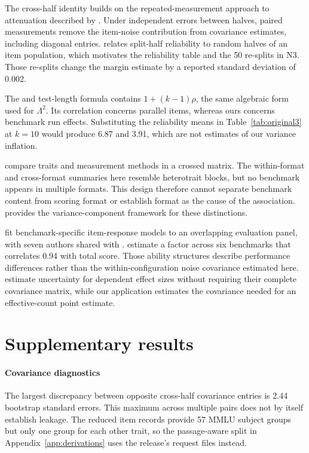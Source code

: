 The cross-half identity builds on the repeated-measurement approach to attenuation described by \citet{spearman1904}. Under independent errors between halves, paired measurements remove the item-noise contribution from covariance estimates, including diagonal entries. \citet{cronbach1951} relates split-half reliability to random halves of an item population, which motivates the reliability table and the 50 re-splits in N3. Those re-splits change the margin estimate by a reported standard deviation of 0.002.

The \citet{brown1910} and \citet{spearman1910} test-length formula contains $1+(k-1)\rho$, the same algebraic form used for $\Lambda^2$. Its correlation concerns parallel items, whereas ours concerns benchmark run effects. Substituting the reliability means in Table~\ref{tab:original3} at $k=10$ would produce 6.87 and 3.91, which are not estimates of our variance inflation.

\citet{campbell1959} compare traits and measurement methods in a crossed matrix. The within-format and cross-format summaries here resemble heterotrait blocks, but no benchmark appears in multiple formats. This design therefore cannot separate benchmark content from scoring format or establish format as the cause of the association. \citet{brennan2001} provides the variance-component framework for these distinctions.

\citet{hofmann2025} fit benchmark-specific item-response models to an overlapping evaluation panel, with seven authors shared with \citet{heineman2025}. \citet{kipnis2024} estimate a factor across six benchmarks that correlates 0.94 with total score. Those ability structures describe performance differences rather than the within-configuration noise covariance estimated here. \citet{hedges2010} estimate uncertainty for dependent effect sizes without requiring their complete covariance matrix, while our application estimates the covariance needed for an effective-count point estimate.

\section{Supplementary results}
\label{app:supplementary}

\paragraph{Covariance diagnostics}
The largest discrepancy between opposite cross-half covariance entries is 2.44 bootstrap standard errors. This maximum across multiple pairs does not by itself establish leakage. The reduced item records provide 57 MMLU subject groups but only one group for each other trait, so the passage-aware split in Appendix~\ref{app:derivations} uses the release's request files instead.

